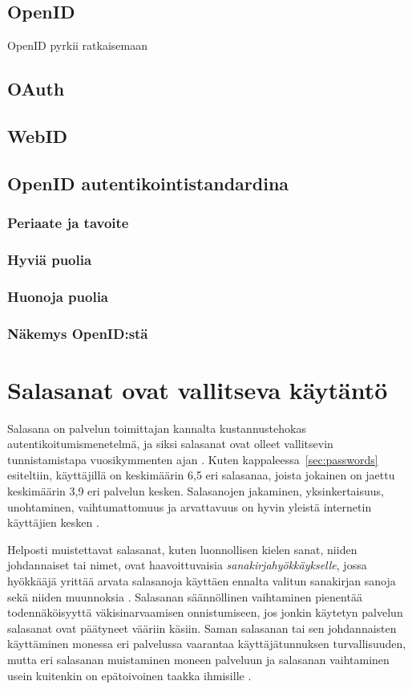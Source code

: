 \documentclass{tktltiki}
\begin{document}
\subsection{OpenID}
OpenID pyrkii ratkaisemaan 
\subsection{OAuth}
\subsection{WebID}
\subsection{OpenID autentikointistandardina}
\subsubsection{Periaate ja tavoite}
\subsubsection{Hyviä puolia}
\subsubsection{Huonoja puolia}
\subsubsection{Näkemys OpenID:stä}

\section{Salasanat ovat vallitseva käytäntö}

Salasana on palvelun toimittajan kannalta kustannustehokas autentikoitumismenetelmä, ja siksi salasanat ovat olleet vallitsevin tunnistamistapa vuosikymmenten ajan \cite{pw_auth_system_perspective_08}. Kuten kappaleessa~\ref{sec:passwords} esiteltiin, käyttäjillä on keskimäärin 6,5 eri salasanaa, joista jokainen on jaettu keskimäärin 3,9 eri palvelun kesken. Salasanojen jakaminen, yksinkertaisuus, unohtaminen, vaihtumattomuus ja arvattavuus on hyvin yleistä internetin käyttäjien kesken \cite{study_of_passwords_07, pw_auth_system_perspective_08, passpet_06}.

Helposti muistettavat salasanat, kuten luonnollisen kielen sanat, niiden johdannaiset tai nimet, ovat haavoittuvaisia \emph{sanakirjahyökkäykselle}, jossa hyökkääjä yrittää arvata salasanoja käyttäen ennalta valitun sanakirjan sanoja sekä niiden muunnoksia \cite{users_are_not_the_enemy_99, passpet_06}. Salasanan säännöllinen vaihtaminen pienentää todennäköisyyttä väkisinarvaamisen onnistumiseen, jos jonkin käytetyn palvelun salasanat ovat päätyneet vääriin käsiin. Saman salasanan tai sen johdannaisten käyttäminen monessa eri palvelussa vaarantaa käyttäjätunnuksen turvallisuuden, mutta eri salasanan muistaminen moneen palveluun ja salasanan vaihtaminen usein kuitenkin on epätoivoinen taakka ihmisille \cite{passpet_06, pw_auth_system_perspective_08, users_are_not_the_enemy_99}.
\end{document}
